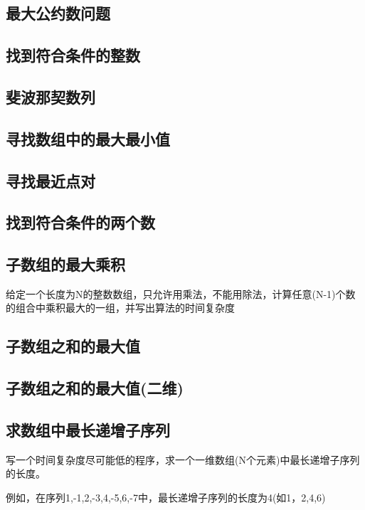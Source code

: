 \documentclass[UTF8,a4paper,12pt]{ctexbook}
\begin{document}
		\subsection{最大公约数问题}
		
		\subsection{找到符合条件的整数 }
		
		\subsection{斐波那契数列 }
		
		\subsection{寻找数组中的最大最小值}
		
		\subsection{寻找最近点对}
		
		\subsection{找到符合条件的两个数}
		
		\subsection{子数组的最大乘积 }
			给定一个长度为N的整数数组，只允许用乘法，不能用除法，计算任意(N-1)个数的组合中乘积最大的一组，并写出算法的时间复杂度 
			
		\subsection{子数组之和的最大值}
		
		\subsection{子数组之和的最大值(二维) }
		
		\subsection{求数组中最长递增子序列 }
			写一个时间复杂度尽可能低的程序，求一个一维数组(N个元素)中最长递增子序列的长度。 
			
			例如，在序列1,-1,2,-3,4,-5,6,-7中，最长递增子序列的长度为4(如1，2,4,6) 
			
\end{document}
